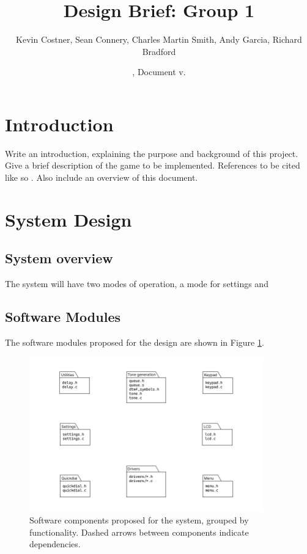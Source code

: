 \documentclass[11pt,a4paper
]{scrartcl}
\title{Design Brief: Group 1}
\author{
   Kevin Costner,
   Sean Connery,
   Charles Martin Smith,
   Andy Garcia,
   Richard Bradford
   }
\date{\svnMaxToday, Document v.\svnInfoMaxRevision}
\begin{document}
\maketitle


\section{Introduction}
Write an introduction, explaining the purpose and background of this project.
Give a brief description of the game to be implemented.
References to be cited like so \cite{stroustrup2000}.
Also include an overview of this document.

\section{System Design}

\subsection{System overview}

The system will have two modes of operation, a mode for settings and 

\subsection{Software Modules}

The software modules proposed for the design are shown in Figure \ref{fig:software_components}. 

\begin{figure}
   \centering
   \includegraphics[width=0.9\textwidth]{software_components}
   \caption{Software components proposed for the system, grouped by functionality. Dashed arrows between components indicate dependencies.}
   \label{fig:software_components}
\end{figure}
\end{document}
